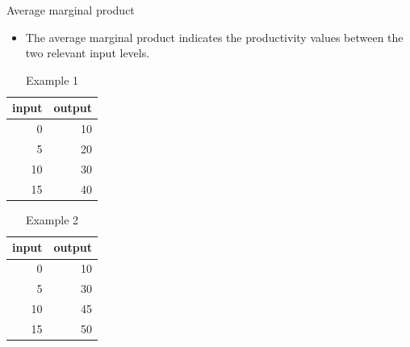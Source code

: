 \documentclass[12pt,ignorenonframetext,aspectratio=169]{beamer}
\providecommand{\tightlist}{%
  \setlength{\itemsep}{0pt}\setlength{\parskip}{0pt}}
\begin{document}
\begin{frame}{Average marginal product}
\protect\hypertarget{average-marginal-product}{}

\begin{itemize}
\tightlist
\item
  The average marginal product indicates the productivity values between
  the two relevant input levels.
\end{itemize}

\begin{table}

\caption{\label{tab:marginal-product1}Example 1}
\centering
\fontsize{6}{8}\selectfont
\begin{tabular}[t]{rr}
\toprule
input & output\\
\midrule
0 & 10\\
5 & 20\\
10 & 30\\
15 & 40\\
\bottomrule
\end{tabular}
\end{table}

\begin{table}

\caption{\label{tab:marginal-product2}Example 2}
\centering
\fontsize{6}{8}\selectfont
\begin{tabular}[t]{rr}
\toprule
input & output\\
\midrule
0 & 10\\
5 & 30\\
10 & 45\\
15 & 50\\
\bottomrule
\end{tabular}
\end{table}

\end{frame}
\end{document}
